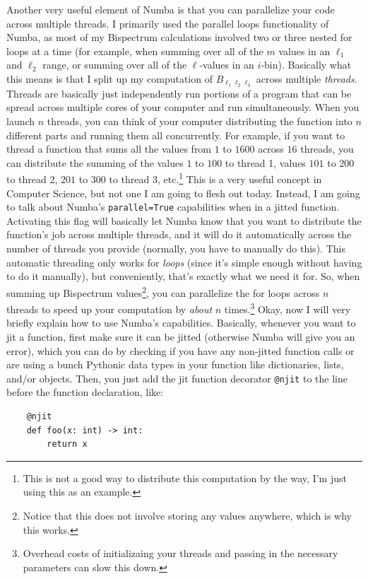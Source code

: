 \documentclass[11pt]{article}
\renewcommand{\_}[1]{\underline{ #1 }}
\newcommand{\npar}{\vspace{.3cm}\newline}
\begin{document}
{\npar
Another very useful element of Numba is that you can parallelize your code across multiple threads. I primarily used the parallel loops functionality of Numba, as most of my Bispectrum calculations involved two or three nested for loops at a time (for example, when summing over all of the $m$ values in an $\ell_1$ and $\ell_2$ range, or summing over all of the $\ell$-values in an $i$-bin). Basically what this means is that I split up my computation of $B_{\ell_1 \ell_2 \ell_3}$ across multiple \textit{threads}. Threads are basically just independently run portions of a program that can be spread across multiple cores of your computer and run simultaneously. When you launch $n$ threads, you can think of your computer distributing the function into $n$ different parts and running them all concurrently. For example, if you want to thread a function that sums all the values from $1$ to $1600$ across $16$ threads, you can distribute the summing of the values $1$ to $100$ to thread 1, values $101$ to $200$ to thread 2, $201$ to $300$ to thread 3, etc.\footnote{This is not a good way to distribute this computation by the way, I'm just using this as an example.} This is a very useful concept in Computer Science, but not one I am going to flesh out today. Instead, I am going to talk about Numba's \texttt{parallel=True} capabilities when in a jitted function. Activating this flag will basically let Numba know that you want to distribute the function's job across multiple threads, and it will do it automatically across the number of threads you provide (normally, you have to manually do this). This automatic threading only works for \textit{loops} (since it's simple enough without having to do it manually), but conveniently, that's exactly what we need it for. So, when summing up Bispectrum values\footnote{Notice that this does not involve storing any values anywhere, which is why this works.}, you can parallelize the for loops across $n$ threads to speed up your computation by \textit{about} $n$ times.\footnote{Overhead costs of initializaing your threads and passing in the necessary parameters can slow this down.}
\npar
Okay, now I will very briefly explain how to use Numba's capabilities. Basically, whenever you want to jit a function, first make sure it can be jitted (otherwise Numba will give you an error), which you can do by checking if you have any non-jitted function calls or are using a bunch Pythonic data types in your function like dictionaries, lists, and/or objects. Then, you just add the jit function decorator \texttt{@njit} to the line before the function declaration, like:
\begin{verbatim}
    @njit
    def foo(x: int) -> int:
        return x
\end{verbatim}

}
\end{document}

